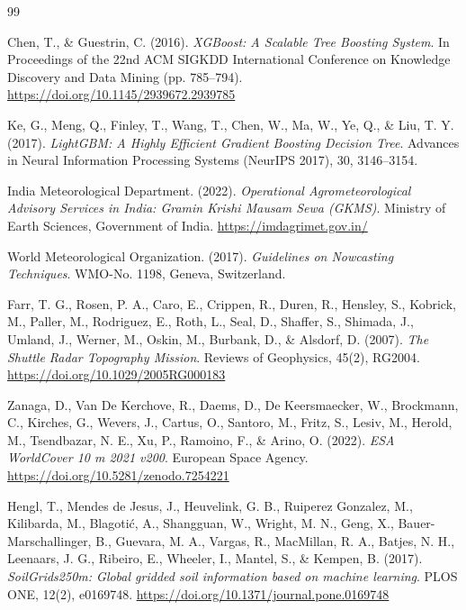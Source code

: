 \documentclass[11pt,a4paper,oneside]{report}
\begin{document}
\newpage
\begin{thebibliography}{99}

Chen, T., \& Guestrin, C. (2016). \textit{XGBoost: A Scalable Tree Boosting System}. In Proceedings of the 22nd ACM SIGKDD International Conference on Knowledge Discovery and Data Mining (pp. 785--794). \url{https://doi.org/10.1145/2939672.2939785}

Ke, G., Meng, Q., Finley, T., Wang, T., Chen, W., Ma, W., Ye, Q., \& Liu, T. Y. (2017). \textit{LightGBM: A Highly Efficient Gradient Boosting Decision Tree}. Advances in Neural Information Processing Systems (NeurIPS 2017), 30, 3146--3154.

India Meteorological Department. (2022). \textit{Operational Agrometeorological Advisory Services in India: Gramin Krishi Mausam Sewa (GKMS)}. Ministry of Earth Sciences, Government of India. \url{https://imdagrimet.gov.in/}

World Meteorological Organization. (2017). \textit{Guidelines on Nowcasting Techniques}. WMO-No. 1198, Geneva, Switzerland.

Farr, T. G., Rosen, P. A., Caro, E., Crippen, R., Duren, R., Hensley, S., Kobrick, M., Paller, M., Rodriguez, E., Roth, L., Seal, D., Shaffer, S., Shimada, J., Umland, J., Werner, M., Oskin, M., Burbank, D., \& Alsdorf, D. (2007). \textit{The Shuttle Radar Topography Mission}. Reviews of Geophysics, 45(2), RG2004. \url{https://doi.org/10.1029/2005RG000183}

Zanaga, D., Van De Kerchove, R., Daems, D., De Keersmaecker, W., Brockmann, C., Kirches, G., Wevers, J., Cartus, O., Santoro, M., Fritz, S., Lesiv, M., Herold, M., Tsendbazar, N. E., Xu, P., Ramoino, F., \& Arino, O. (2022). \textit{ESA WorldCover 10 m 2021 v200}. European Space Agency. \url{https://doi.org/10.5281/zenodo.7254221}

Hengl, T., Mendes de Jesus, J., Heuvelink, G. B., Ruiperez Gonzalez, M., Kilibarda, M., Blagotić, A., Shangguan, W., Wright, M. N., Geng, X., Bauer-Marschallinger, B., Guevara, M. A., Vargas, R., MacMillan, R. A., Batjes, N. H., Leenaars, J. G., Ribeiro, E., Wheeler, I., Mantel, S., \& Kempen, B. (2017). \textit{SoilGrids250m: Global gridded soil information based on machine learning}. PLOS ONE, 12(2), e0169748. \url{https://doi.org/10.1371/journal.pone.0169748}


\end{thebibliography}
\end{document}
